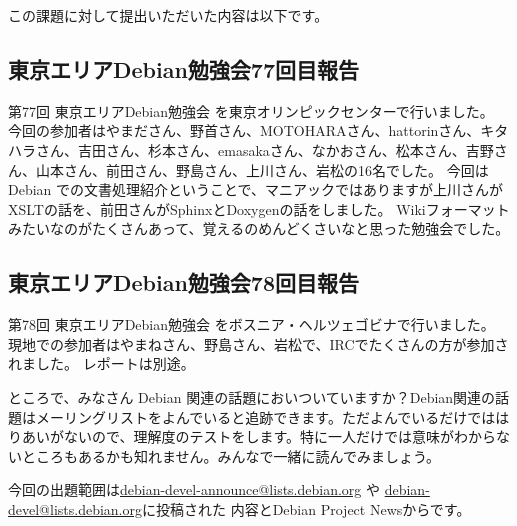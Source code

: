 \documentclass[mingoth,a4paper]{jsarticle}
\begin{document}
この課題に対して提出いただいた内容は以下です。
\begin{multicols}{2}
{\small

}
\end{multicols}

\subsection{東京エリアDebian勉強会77回目報告}

第77回 東京エリアDebian勉強会 を東京オリンピックセンターで行いました。
今回の参加者はやまださん、野首さん、MOTOHARAさん、hattorinさん、キタハラさん、吉田さん、杉本さん、emasakaさん、なかおさん、松本さん、吉野さん、山本さん、前田さん、野島さん、上川さん、岩松の16名でした。
今回は Debian での文書処理紹介ということで、マニアックではありますが上川さんがXSLTの話を、前田さんがSphinxとDoxygenの話をしました。 Wikiフォーマットみたいなのがたくさんあって、覚えるのめんどくさいなと思った勉強会でした。

\subsection{東京エリアDebian勉強会78回目報告}
第78回 東京エリアDebian勉強会 をボスニア・ヘルツェゴビナで行いました。
現地での参加者はやまねさん、野島さん、岩松で、IRCでたくさんの方が参加されました。
レポートは別途。





ところで、みなさん Debian 関連の話題においついていますか？Debian関連の話
題はメーリングリストをよんでいると追跡できます。ただよんでいるだけではは
りあいがないので、理解度のテストをします。特に一人だけでは意味がわからな
いところもあるかも知れません。みんなで一緒に読んでみましょう。

今回の出題範囲は\url{debian-devel-announce@lists.debian.org} や \url{debian-devel@lists.debian.org}に投稿された
内容とDebian Project Newsからです。

\begin{multicols}{2}
 
\end{multicols}

\end{document}
